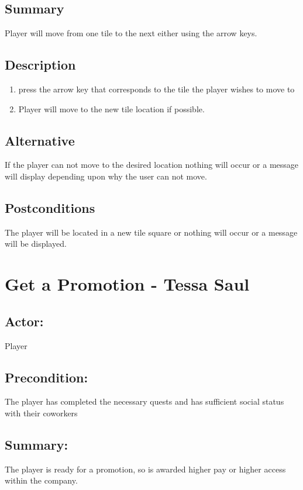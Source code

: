 \documentclass[11pt]{article}
\begin{document}
		\subsection{Summary}
		Player will move from one tile to the next either using the arrow keys.
		
		\subsection{Description}
			\begin{enumerate}
			\item press the arrow key that corresponds to the tile the player wishes to move to
			\item Player will move to the new tile location if possible.
			\end{enumerate}

		\subsection{Alternative}
			If the player can not move to the desired location nothing will occur or a message will display depending upon why the user can not move.
		\subsection{Postconditions}	
			The player will be located in a new tile square or nothing will occur or a message will be displayed.


      \section{Get a Promotion - Tessa Saul}
        \subsection{Actor:} Player

        \subsection{Precondition:} The player has completed the necessary quests and has sufficient social status with their coworkers

        \subsection{Summary:} The player is ready for a promotion, so is awarded higher pay or higher access within the company.
\end{document}
